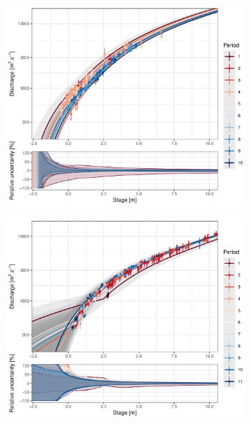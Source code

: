 \documentclass[11pt]{article}
\begin{document}
	
    \begin{figure}[h!]
    \centering
        \begin{subfigure}{0.49\textwidth}
            \centering
            \includegraphics[width=\linewidth]{Figs/7a-RClog_ICdownPt.pdf}
            \caption{}
            \label{subfig:RcPt}
        \end{subfigure}
        \begin{subfigure}{0.49\textwidth}
            \centering
            \includegraphics[width=\linewidth]{Figs/7b-RClog_ICdownRes.pdf}
            \caption{}
            \label{subfig:RcRes}
        \end{subfigure}
        

\end{figure}
\end{document}
